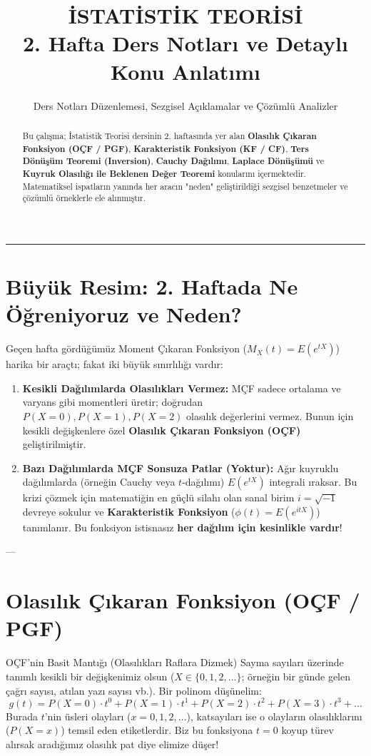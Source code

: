 \documentclass[12pt,a4paper]{article}
\title{\textbf{İSTATİSTİK TEORİSİ}\\[0.3em] \Large 2. Hafta Ders Notları ve Detaylı Konu Anlatımı}
\author{Ders Notları Düzenlemesi, Sezgisel Açıklamalar ve Çözümlü Analizler}
\date{}
\begin{document}
\maketitle

\begin{abstract}
Bu çalışma; İstatistik Teorisi dersinin 2. haftasında yer alan \textbf{Olasılık Çıkaran Fonksiyon (OÇF / PGF)}, \textbf{Karakteristik Fonksiyon (KF / CF)}, \textbf{Ters Dönüşüm Teoremi (Inversion)}, \textbf{Cauchy Dağılımı}, \textbf{Laplace Dönüşümü} ve \textbf{Kuyruk Olasılığı ile Beklenen Değer Teoremi} konularını içermektedir. Matematiksel ispatların yanında her aracın "neden" geliştirildiği sezgisel benzetmeler ve çözümlü örneklerle ele alınmıştır.
\end{abstract}

\hrule
\vspace{1em}

\section{Büyük Resim: 2. Haftada Ne Öğreniyoruz ve Neden?}

Geçen hafta gördüğümüz Moment Çıkaran Fonksiyon ($M_X(t) = E(e^{tX})$) harika bir araçtı; fakat iki büyük sınırlılığı vardır:
\begin{enumerate}
    \item \textbf{Kesikli Dağılımlarda Olasılıkları Vermez:} MÇF sadece ortalama ve varyans gibi momentleri üretir; doğrudan $P(X=0), P(X=1), P(X=2)$ olasılık değerlerini vermez. Bunun için kesikli değişkenlere özel \textbf{Olasılık Çıkaran Fonksiyon (OÇF)} geliştirilmiştir.
    \item \textbf{Bazı Dağılımlarda MÇF Sonsuza Patlar (Yoktur):} Ağır kuyruklu dağılımlarda (örneğin Cauchy veya $t$-dağılımı) $E(e^{tX})$ integrali ıraksar. Bu krizi çözmek için matematiğin en güçlü silahı olan sanal birim $i = \sqrt{-1}$ devreye sokulur ve \textbf{Karakteristik Fonksiyon} ($\phi(t) = E(e^{itX})$) tanımlanır. Bu fonksiyon istisnasız \textbf{her dağılım için kesinlikle vardır}!
\end{enumerate}

---

\section{Olasılık Çıkaran Fonksiyon (OÇF / PGF)}

\begin{sezgi}{OÇF'nin Basit Mantığı (Olasılıkları Raflara Dizmek)}
Sayma sayıları üzerinde tanımlı kesikli bir değişkenimiz olsun ($X \in \{0, 1, 2, \dots\}$; örneğin bir günde gelen çağrı sayısı, atılan yazı sayısı vb.).  
Bir polinom düşünelim:
\begin{equation}
    g(t) = P(X=0) \cdot t^0 + P(X=1) \cdot t^1 + P(X=2) \cdot t^2 + P(X=3) \cdot t^3 + \dots
\end{equation}
Burada $t$'nin üsleri olayları ($x=0, 1, 2, \dots$), katsayıları ise o olayların olasılıklarını ($P(X=x)$) temsil eden etiketlerdir.  
Biz bu fonksiyona $t=0$ koyup türev alırsak aradığımız olasılık pat diye elimize düşer!
\end{sezgi}
\end{document}
